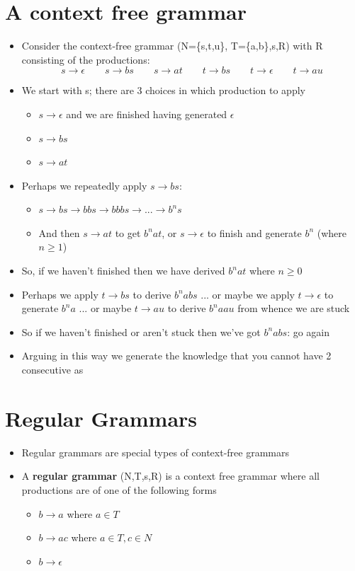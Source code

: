\documentclass{article}[18pt]
\begin{document}
\section{A context free grammar}
\begin{itemize}
\item Consider the context-free grammar (N=\{s,t,u\}, T=\{a,b\},s,R) with R consisting of the productions:
$$s\rightarrow\epsilon \qquad s\rightarrow bs \qquad s\rightarrow at \qquad t\rightarrow bs \qquad	 t\rightarrow \epsilon \qquad t\rightarrow au$$
\item We start with s; there are 3 choices in which production to apply
\begin{itemize}
\item $s\rightarrow \epsilon$ \qquad \qquad and we are finished having generated $\epsilon$
\item $s\rightarrow bs$
\item $s\rightarrow at$
\end{itemize}
\item Perhaps we repeatedly apply $s\rightarrow bs$:
\begin{itemize}
\item $s\rightarrow bs \rightarrow bbs \rightarrow bbbs \rightarrow...\rightarrow b^ns$
\item And then $s\rightarrow at$ to get $b^nat$, or $s\rightarrow \epsilon$ to finish and generate $b^n$ (where $n\geqslant 1$)
\end{itemize}
\item So, if we haven't finished then we have derived $b^nat$ where $n\geqslant 0$
\item Perhaps we apply $t\rightarrow bs$ to derive $b^nabs$ ... or maybe we apply $t\rightarrow \epsilon$ to generate $b^na$ ... or maybe $t\rightarrow au$ to derive $b^naau$ from whence we are stuck
\item So if we haven't finished or aren't stuck then we've got $b^nabs$: go again
\item Arguing in this way we generate the knowledge that you cannot have 2 consecutive as
\end{itemize}
\section{Regular Grammars}
\begin{itemize}
\item Regular grammars are special types of context-free grammars
\item A \textbf{regular grammar} (N,T,s,R) is a context free grammar where all productions are of one of the following forms
\begin{itemize}
\item $b\rightarrow a$ \qquad \qquad where $a\in T$
\item $b\rightarrow ac$ \qquad \qquad where $a\in T, c\in N$
\item $b\rightarrow \epsilon$
\end{itemize}
\end{itemize}
\end{document}
